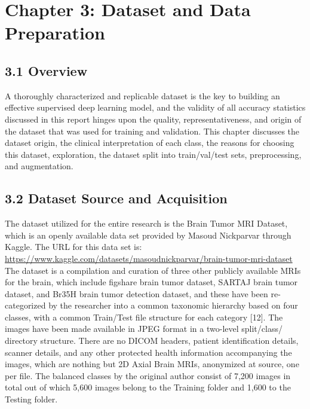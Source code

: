\documentclass[12pt,a4paper,oneside]{report}
\begin{document}
\chapter{Chapter 3: Dataset and Data Preparation}
\section{3.1 Overview}
A thoroughly characterized and replicable dataset is the key to building an effective supervised deep learning model, and the validity of all accuracy statistics discussed in this report hinges upon the quality, representativeness, and origin of the dataset that was used for training and validation. This chapter discusses the dataset origin, the clinical interpretation of each class, the reasons for choosing this dataset, exploration, the dataset split into train/val/test sets, preprocessing, and augmentation.
\section{3.2 Dataset Source and Acquisition}
The dataset utilized for the entire research is the Brain Tumor MRI Dataset, which is an openly available data set provided by Masoud Nickparvar through Kaggle. The URL for this data set is:
\url{https://www.kaggle.com/datasets/masoudnickparvar/brain-tumor-mri-dataset}
The dataset is a compilation and curation of three other publicly available MRIs for the brain, which include figshare brain tumor dataset, SARTAJ brain tumor dataset, and Br35H brain tumor detection dataset, and these have been re-categorized by the researcher into a common taxonomic hierarchy based on four classes, with a common Train/Test file structure for each category [12].
The images have been made available in JPEG format in a two-level split/class/ directory structure. There are no DICOM headers, patient identification details, scanner details, and any other protected health information accompanying the images, which are nothing but 2D Axial Brain MRIs, anonymized at source, one per file. The balanced classes by the original author consist of 7,200 images in total out of which 5,600 images belong to the Training folder and 1,600 to the Testing folder.
\end{document}
